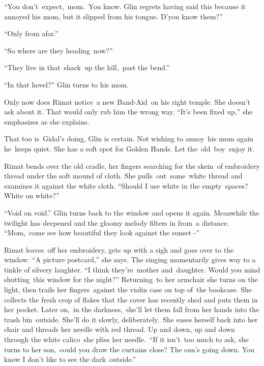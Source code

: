 \documentclass[twoside,11pt]{book}
\begin{document}
{{}``You
don't~}expect,~mom{.~You know.{\textquotedbl} Glin regrets having said
this because it annoyed his  mom, but it slipped from his tongue.
{\textquotedbl}}D{}'y{ou know them?''\ }

{{}``Only from afar.''}

{{}``So where are they heading~now?''}

{{}``They live in that\ shack\ up the
hill,\ }past{ the bend.''}

{{}``In that hovel?'' Glin turns }to his
mom{.}

{Only now does Rimat notice~a new
B}and-Aid\ {on his right temple. She doesn't ask about it. T}hat would
only rub him the wrong way{. ``It's been fixed up,{}'' she emphasizes
as she explains. }\ 

{That too is\ Gidal's doing, Glin is certain. Not wishing to annoy\ his
}mom{ again he\ keeps quiet. She has a soft spot for Golden Hands. Let
the\ }old\ boy\ {enjoy it.}\ 

{Rimat bends over the old cradle, her fingers searching for the
}skein\ {of embroidery thread under the soft mound of cloth. She
pulls\ }out\ some\ {white thread and examines it against the white
cloth. ``Should I use white in the }empty{\ spaces? White on white?''}

{{}``Void on void.{}'' Glin
}turns{ back to the window and opens it again. Meanwhile the twilight
has deepened and the gloomy melody filters in from~a distance. ``Mom,\ come see how beautiful they look against the
sunset -{}''}\ 

{Rimat leaves\ off her embroidery, gets up with a sigh and goes over to
the window. ``A picture postcard,'' she says. The singing momentarily gives way to a tinkle of silvery laughter. ``I
think they're~mother and~daughter}. Would you mind shutting\ this window for the
night?{{}''
}Returning{\ }{to her armchair
she turns on the light, }then trails her fingers\ {against the violin
case on }top of{\ }{the
bookcase. She collects the fresh crop of flakes that the cover has recently shed and
}puts{ them in her pocket. Later on},~in the
darkness,\ {she'll let them fall from her hands into the trash
bin\ }outside{. She'll do it slowly, deliberately.~She eases herself
back into her chair and threads her needle with red thread. Up and down, up and down }through the white calico\ she
{plies her needle.\  ``If it
isn't}{\ }{too much to
ask,{\textquotedbl} she }turns to her son,\ {{\textquotedbl}could you
}draw the curtains close? The sun's going down.{ You know I don't like
to see the dark}\ {outside.''\ }
\end{document}
